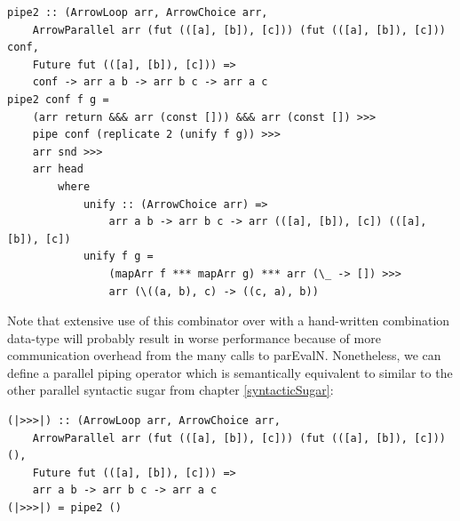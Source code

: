 \begin{lstlisting}[frame=htrbl]
pipe2 :: (ArrowLoop arr, ArrowChoice arr,
	ArrowParallel arr (fut (([a], [b]), [c])) (fut (([a], [b]), [c])) conf,
	Future fut (([a], [b]), [c])) =>
	conf -> arr a b -> arr b c -> arr a c
pipe2 conf f g = 
	(arr return &&& arr (const [])) &&& arr (const []) >>>
	pipe conf (replicate 2 (unify f g)) >>>
	arr snd >>>
	arr head
		where
			unify :: (ArrowChoice arr) =>
				arr a b -> arr b c -> arr (([a], [b]), [c]) (([a], [b]), [c])
			unify f g =
				(mapArr f *** mapArr g) *** arr (\_ -> []) >>>
				arr (\((a, b), c) -> ((c, a), b))
\end{lstlisting}
Note that extensive use of this combinator over  with a hand-written combination data-type will probably result in worse performance because of more communication overhead from the many calls to parEvalN. Nonetheless, we can define a parallel piping operator \code{|>>>|} which is semantically equivalent to \code{>>>} similar to the other parallel syntactic sugar from chapter \ref{syntacticSugar}:
\begin{lstlisting}[frame=htrbl]
(|>>>|) :: (ArrowLoop arr, ArrowChoice arr,
	ArrowParallel arr (fut (([a], [b]), [c])) (fut (([a], [b]), [c])) (),
	Future fut (([a], [b]), [c])) =>
	arr a b -> arr b c -> arr a c
(|>>>|) = pipe2 ()
\end{lstlisting}

